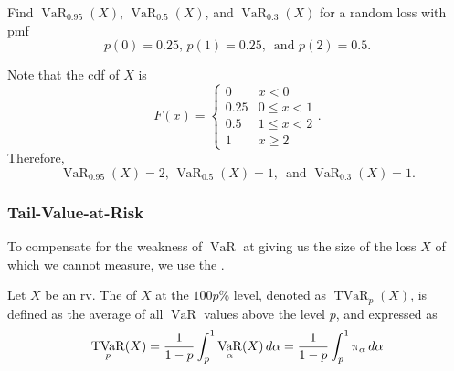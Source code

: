 \documentclass[notoc,notitlepage]{tufte-book}
\DeclareMathOperator{\VaR}{VaR}
\DeclareMathOperator{\TVaR}{TVaR}
\begin{document}
\begin{eg}
  Find $\VaR_{0.95}(X)$, $\VaR_{0.5}(X)$, and $\VaR_{0.3}(X)$ for a random loss with pmf
  \begin{equation*}
    p(0) = 0.25, \, p(1) = 0.25, \, \text{ and } p(2) = 0.5.
  \end{equation*}
\end{eg}

\begin{solution}
  Note that the cdf of $X$ is
  \begin{equation*}
    F(x) = \begin{cases}
      0    & x < 0 \\
      0.25 & 0 \leq x < 1 \\
      0.5  & 1 \leq x < 2 \\
      1    & x \geq 2
    \end{cases}.
  \end{equation*}
  Therefore,
  \begin{equation*}
    \VaR_{0.95}(X) = 2, \, \VaR_{0.5}(X) = 1, \, \text{ and } \VaR_{0.3}(X) = 1.
  \end{equation*}
\end{solution}

\subsubsection{Tail-Value-at-Risk}\label{ssub:Tail-Value-at-Risk}

To compensate for the weakness of $\VaR$ at giving us the size of the loss $X$ of which we cannot measure, we use the .

\begin{defn}\label{defn:tail_value_at_risk}
Let $X$ be an rv. The  of $X$ at the $100p\%$ level, denoted as $\TVaR_p(X)$, is defined as the average of all $\VaR$ values above the level $p$, and expressed as
  \begin{equation*}
    \TVaR_p(X) = \frac{1}{1 - p} \int_{p}^{1} \VaR_\alpha(X) \dif{\alpha} = \frac{1}{1 - p} \int_{p}^{1} \pi_\alpha \dif{\alpha}
  \end{equation*}
\end{defn}
\end{document}
